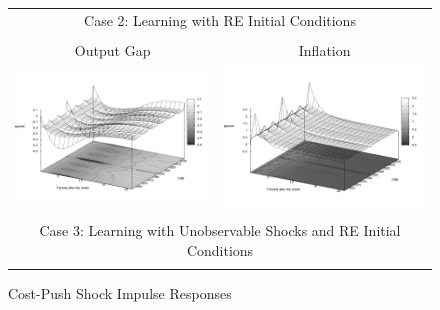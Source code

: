 \begin{figure}
\caption{Cost-Push Shock Impulse Responses}\label{fg:irf_cost}
\vspace*{1pc}
\begin{tabular}{cc}
\multicolumn{2}{c}{Case 2: Learning with RE Initial Conditions}\\ \\
Output Gap & Inflation \\ 
\includegraphics[scale=0.25]{results_reallinit/Output_costshock_irf3d.png} & 
\includegraphics[scale=0.25]{results_reallinit/Inflation_costshock_irf3d.png} \\ \\ 
\multicolumn{2}{c}{Case 3: Learning with Unobservable Shocks and RE Initial Conditions}\\ \\

\end{tabular}
\end{figure}
